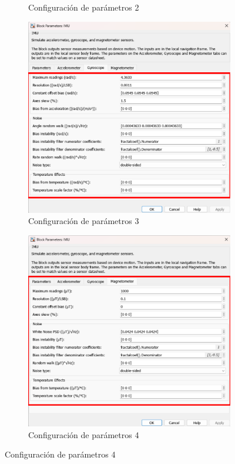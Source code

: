 \begin{figure}[htbp]
\begin{subfigure}[b]{0.45\textwidth}
        \caption{Configuración de parámetros 2}
        \label{fig:parametros_IMU_02}
    \end{subfigure}
    \hfill
    \begin{subfigure}[b]{0.45\textwidth}
        \centering
        \includegraphics[width=\textwidth]{fig/Capitulo5/Caso_de_estudio_IMU/Generador_de_archivos/configuracion_parametros_IMU_03.pdf}
        \caption{Configuración de parámetros 3}
        \label{fig:parametros_IMU_03}
    \end{subfigure}
    \hfill
    \begin{subfigure}[b]{0.45\textwidth}
        \centering
        \includegraphics[width=\textwidth]{fig/Capitulo5/Caso_de_estudio_IMU/Generador_de_archivos/configuracion_parametros_IMU_04.pdf}
        \caption{Configuración de parámetros 4}
        \label{fig:parametros_IMU_04}
    \end{subfigure}


\end{figure}
